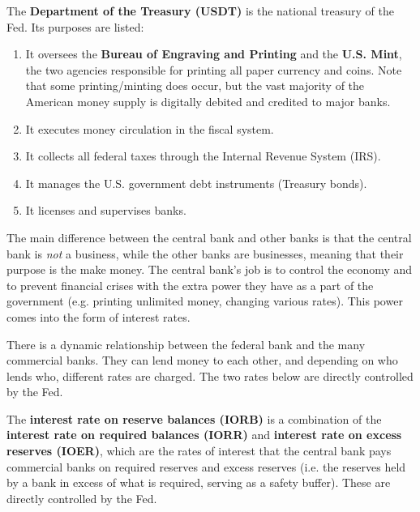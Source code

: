 \documentclass{article}
\begin{document}
    \begin{definition}
      \label{def:u-s-department-of-the-treasury}
      The \textbf{Department of the Treasury (USDT)} is the national treasury of the Fed. Its purposes are listed: 
      \begin{enumerate}
        \item It oversees the \textbf{Bureau of Engraving and Printing} and the \textbf{U.S. Mint}, the two agencies responsible for printing all paper currency and coins. Note that some printing/minting does occur, but the vast majority of the American money supply is digitally debited and credited to major banks. 
        \item It executes money circulation in the fiscal system. 
        \item It collects all federal taxes through the Internal Revenue System (IRS). 
        \item It manages the U.S. government debt instruments (Treasury bonds). 
        \item It licenses and supervises banks. 
      \end{enumerate}
    \end{definition}

    The main difference between the central bank and other banks is that the central bank is \textit{not} a business, while the other banks are businesses, meaning that their purpose is the make money. The central bank's job is to control the economy and to prevent financial crises with the extra power they have as a part of the government (e.g. printing unlimited money, changing various rates). This power comes into the form of interest rates. 

    There is a dynamic relationship between the federal bank and the many commercial banks. They can lend money to each other, and depending on who lends who, different rates are charged. The two rates below are directly controlled by the Fed.

    \begin{definition}
      \label{def:interest-on-reserve-balances}
      The \textbf{interest rate on reserve balances (IORB)} is a combination of the \textbf{interest rate on required balances (IORR)} and \textbf{interest rate on excess reserves (IOER)}, which are the rates of interest that the central bank pays commercial banks on required reserves and excess reserves (i.e. the reserves held by a bank in excess of what is required, serving as a safety buffer). These are directly controlled by the Fed.
    \end{definition}
\end{document}

